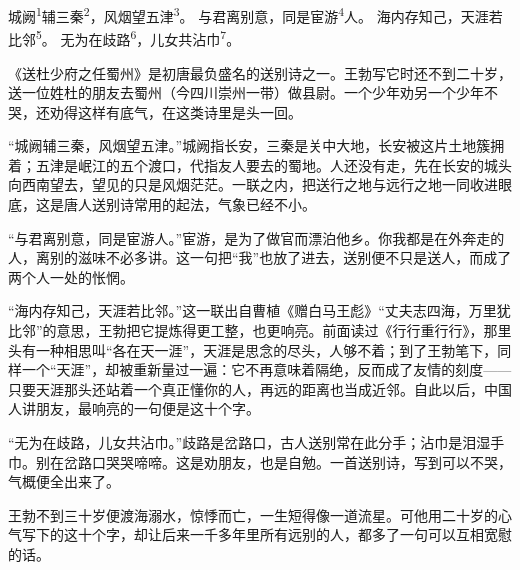 
\begin{poem}
城阙\textsuperscript{1}辅三秦\textsuperscript{2}，风烟望五津\textsuperscript{3}。
与君离别意，同是宦游\textsuperscript{4}人。
海内存知己，天涯若比邻\textsuperscript{5}。
无为在歧路\textsuperscript{6}，儿女共沾巾\textsuperscript{7}。
\end{poem}

\begin{annotations}
\end{annotations}

\begin{appreciation}
《送杜少府之任蜀州》是初唐最负盛名的送别诗之一。王勃写它时还不到二十岁，送一位姓杜的朋友去蜀州（今四川崇州一带）做县尉。一个少年劝另一个少年不哭，还劝得这样有底气，在这类诗里是头一回。

“城阙辅三秦，风烟望五津。”城阙指长安，三秦是关中大地，长安被这片土地簇拥着；五津是岷江的五个渡口，代指友人要去的蜀地。人还没有走，先在长安的城头向西南望去，望见的只是风烟茫茫。一联之内，把送行之地与远行之地一同收进眼底，这是唐人送别诗常用的起法，气象已经不小。

“与君离别意，同是宦游人。”宦游，是为了做官而漂泊他乡。你我都是在外奔走的人，离别的滋味不必多讲。这一句把“我”也放了进去，送别便不只是送人，而成了两个人一处的怅惘。

“海内存知己，天涯若比邻。”这一联出自曹植《赠白马王彪》“丈夫志四海，万里犹比邻”的意思，王勃把它提炼得更工整，也更响亮。前面读过《行行重行行》，那里头有一种相思叫“各在天一涯”，天涯是思念的尽头，人够不着；到了王勃笔下，同样一个“天涯”，却被重新量过一遍：它不再意味着隔绝，反而成了友情的刻度——只要天涯那头还站着一个真正懂你的人，再远的距离也当成近邻。自此以后，中国人讲朋友，最响亮的一句便是这十个字。

“无为在歧路，儿女共沾巾。”歧路是岔路口，古人送别常在此分手；沾巾是泪湿手巾。别在岔路口哭哭啼啼。这是劝朋友，也是自勉。一首送别诗，写到可以不哭，气概便全出来了。

王勃不到三十岁便渡海溺水，惊悸而亡，一生短得像一道流星。可他用二十岁的心气写下的这十个字，却让后来一千多年里所有远别的人，都多了一句可以互相宽慰的话。
\end{appreciation}
